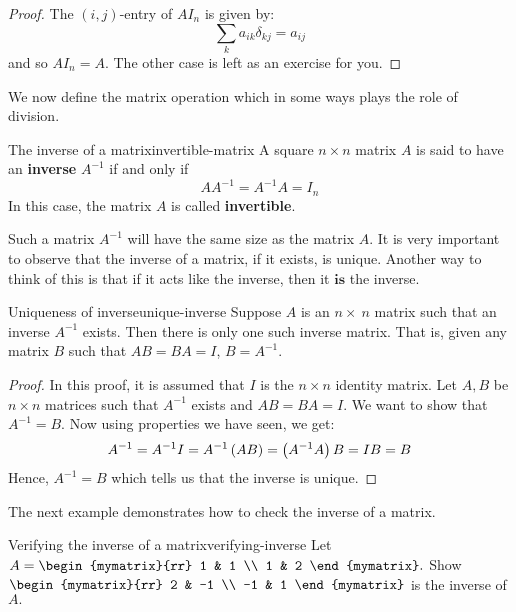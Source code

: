 \begin{proof}
The $(i,j)$-entry of $AI_n$ is given by:
\begin{equation*}
\sum_{k}a_{ik}\delta _{kj}=a_{ij}
\end{equation*}
and so $AI_{n}=A.$ The other case is left as an exercise for you. 
\end{proof}

We now define the matrix operation which in some ways plays the role of division. 

\begin{definition}{The inverse of a matrix}{invertible-matrix}
A square  $n\times n$ matrix $A$ is said to have an \textbf{inverse} $A^{-1}$
if and only if 
\begin{equation*}
AA^{-1}=A^{-1}A=I_n
\end{equation*}
In this case, the matrix $A$ is called
 \textbf{invertible}.
\end{definition}

Such a  matrix $A^{-1}$ will have the same size as the matrix $A$. 
It is very important to observe that the inverse of a matrix, if it exists,
is unique. Another way to think of this is that if it acts like the inverse,
then it $\textbf{is}$ the inverse.

\begin{theorem}{Uniqueness of inverse}{unique-inverse}
Suppose $A$ is an $n \times\ n$ matrix such that an inverse  $A^{-1}$ exists. Then there is only one such 
inverse matrix. 
That is, given any matrix $B$ such that $AB=BA=I$, $B=A^{-1}$.
\end{theorem}

\begin{proof} In this proof, it is assumed that $I$ is the $n \times n$ identity matrix. 
Let $A, B$ be $n \times n$ matrices such that $A^{-1}$ exists and $AB=BA=I$. 
We want to show that $A^{-1} = B$. 
Now using properties we have seen, we get: 
\begin{equation*}
A^{-1}=A^{-1}I=A^{-1}\left(AB\right) =\left(A^{-1}A\right) B=IB=B
\end{equation*}
Hence, $A^{-1} = B$ which tells us that the inverse is unique.
\end{proof}

The next example demonstrates how to check the inverse of a matrix. 

\begin{example}{Verifying the inverse of a matrix}{verifying-inverse}
Let $A=\begin{mymatrix}{rr}
1 & 1 \\
1 & 2
\end{mymatrix} .$ Show $\begin{mymatrix}{rr}
2 & -1 \\
-1 & 1
\end{mymatrix} $ is the inverse of $A.$
\end{example}

